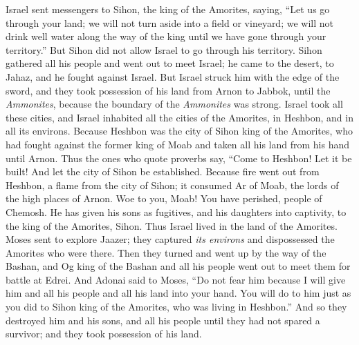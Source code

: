 \begin{biblechapter}
 Israel sent messengers to Sihon, the king of the Amorites, saying,
\verse “Let us go through your land; we will not turn aside into a field or vineyard; we will not drink well water along the way of the king until we have gone through your territory.”
\verse But Sihon did not allow Israel to go through his territory. Sihon gathered all his people and went out to meet Israel; he came to the desert, to Jahaz, and he fought against Israel.
\verse But Israel struck him with the edge of the sword, and they took possession of his land from Arnon to Jabbok, until the \textit{Ammonites}, because the boundary of the \textit{Ammonites} was strong.
\verse Israel took all these cities, and Israel inhabited all the cities of the Amorites, in Heshbon, and in all its environs.
\verse Because Heshbon was the city of Sihon king of the Amorites, who had fought against the former king of Moab and taken all his land from his hand until Arnon.
\verse Thus the ones who quote proverbs say,
\verse “Come to Heshbon! Let it be built! 
And let the city of Sihon be established.
\verse Because fire went out from Heshbon, 
a flame from the city of Sihon; 
it consumed Ar of Moab, 
the lords of the high places of Arnon.
\verse Woe to you, Moab! 
You have perished, people of Chemosh. 
He has given his sons as fugitives, 
and his daughters into captivity, 
to the king of the Amorites, Sihon.
\verse Thus Israel lived in the land of the Amorites.
\verse Moses sent to explore Jaazer; they captured \textit{its environs} and dispossessed the Amorites who were there.
\verse Then they turned and went up by the way of the Bashan, and Og king of the Bashan and all his people went out to meet them for battle at Edrei.
\verse And Adonai said to Moses, “Do not fear him because I will give him and all his people and all his land into your hand. You will do to him just as you did to Sihon king of the Amorites, who was living in Heshbon.”
\verse And so they destroyed him and his sons, and all his people until they had not spared a survivor; and they took possession of his land.
\end{biblechapter}

